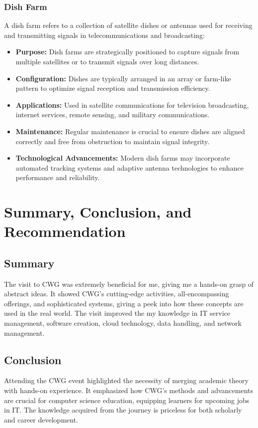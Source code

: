 \documentclass[a4paper,12pt]{report}
\begin{document}
	\subsection{Dish Farm}
	
	A dish farm refers to a collection of satellite dishes or antennas used for receiving and transmitting signals in telecommunications and broadcasting:
	
	\begin{itemize}
		\item \textbf{Purpose:} Dish farms are strategically positioned to capture signals from multiple satellites or to transmit signals over long distances.
		\item \textbf{Configuration:} Dishes are typically arranged in an array or farm-like pattern to optimize signal reception and transmission efficiency.
		\item \textbf{Applications:} Used in satellite communications for television broadcasting, internet services, remote sensing, and military communications.
		\item \textbf{Maintenance:} Regular maintenance is crucial to ensure dishes are aligned correctly and free from obstruction to maintain signal integrity.
		\item \textbf{Technological Advancements:} Modern dish farms may incorporate automated tracking systems and adaptive antenna technologies to enhance performance and reliability.
	\end{itemize}
	
	\chapter{Summary, Conclusion, and Recommendation}
	
	\section{Summary}
	The visit to CWG was extremely beneficial for me, giving me a hands-on grasp of abstract ideas. It showed CWG's cutting-edge activities, all-encompassing offerings, and sophisticated systems, giving a peek into how these concepts are used in the real world. The visit improved the my knowledge in IT service management, software creation, cloud technology, data handling, and network management.
	
	
	\section{Conclusion}
	Attending the CWG event highlighted the necessity of merging academic theory with hands-on experience. It emphasized how CWG's methods and advancements are crucial for computer science education, equipping learners for upcoming jobs in IT. The knowledge acquired from the journey is priceless for both scholarly and career development.
	
\end{document}
